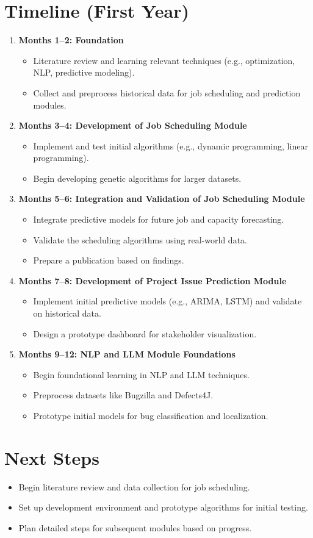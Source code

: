 \documentclass[12pt]{article}
\begin{document}
\section*{Timeline (First Year)}
\begin{enumerate}
    \item \textbf{Months 1--2: Foundation}
    \begin{itemize}
        \item Literature review and learning relevant techniques (e.g., optimization, NLP, predictive modeling).
        \item Collect and preprocess historical data for job scheduling and prediction modules.
    \end{itemize}
    \item \textbf{Months 3--4: Development of Job Scheduling Module}
    \begin{itemize}
        \item Implement and test initial algorithms (e.g., dynamic programming, linear programming).
        \item Begin developing genetic algorithms for larger datasets.
    \end{itemize}
    \item \textbf{Months 5--6: Integration and Validation of Job Scheduling Module}
    \begin{itemize}
        \item Integrate predictive models for future job and capacity forecasting.
        \item Validate the scheduling algorithms using real-world data.
        \item Prepare a publication based on findings.
    \end{itemize}
    \item \textbf{Months 7--8: Development of Project Issue Prediction Module}
    \begin{itemize}
        \item Implement initial predictive models (e.g., ARIMA, LSTM) and validate on historical data.
        \item Design a prototype dashboard for stakeholder visualization.
    \end{itemize}
    \item \textbf{Months 9--12: NLP and LLM Module Foundations}
    \begin{itemize}
        \item Begin foundational learning in NLP and LLM techniques.
        \item Preprocess datasets like Bugzilla and Defects4J.
        \item Prototype initial models for bug classification and localization.
    \end{itemize}
\end{enumerate}

\section*{Next Steps}
\begin{itemize}
    \item Begin literature review and data collection for job scheduling.
    \item Set up development environment and prototype algorithms for initial testing.
    \item Plan detailed steps for subsequent modules based on progress.
\end{itemize}
\end{document}

